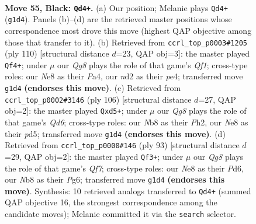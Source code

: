 \documentclass[11pt]{article}
\begin{document}
\clearpage

\begin{figure}[p]\centering
\begin{subfigure}{0.46\textwidth}\centering
\resizebox{\linewidth}{!}{%
\newchessgame
\chessboard[
  setfen={1n2n3/5k2/7p/Q7/P6K/8/3N4/6q1 b - - 10 55},
  showmover=false,
  pgfstyle=straightmove, color=movearrow, markmove={g1-d4}
]}
\caption{}
\end{subfigure}\hfill
\begin{subfigure}{0.46\textwidth}\centering
\resizebox{\linewidth}{!}{%
\newchessgame
\chessboard[
  setfen={1k6/1P6/2p5/2q5/P3p3/1K6/8/5Q2 w - - 0 56},
  showmover=false,
  pgfstyle=straightmove, color=movearrow, markmove={f1-f4}
]}
\caption{}
\end{subfigure}
\\[4pt]
\begin{subfigure}{0.46\textwidth}\centering
\resizebox{\linewidth}{!}{%
\newchessgame
\chessboard[
  setfen={8/5k2/3Q4/p2p2K1/q7/2P5/7P/8 w - - 4 54},
  showmover=false,
  pgfstyle=straightmove, color=movearrow, markmove={d6-d5}
]}
\caption{}
\end{subfigure}\hfill
\begin{subfigure}{0.46\textwidth}\centering
\resizebox{\linewidth}{!}{%
\newchessgame
\chessboard[
  setfen={8/4k3/Q2p2p1/P2P4/8/7K/5q2/8 b - - 4 47},
  showmover=false,
  pgfstyle=straightmove, color=movearrow, markmove={f2-f3}
]}
\caption{}
\end{subfigure}
\caption{\textbf{Move 55, Black: \texttt{Qd4+}.} (a) Our position; Melanie plays \texttt{Qd4+} (\texttt{g1d4}). Panels (b)--(d) are the retrieved master positions whose correspondence most drove this move (highest QAP objective among those that transfer to it). (b) Retrieved from \texttt{ccrl\_top\_p0003\#1205} (ply 110) [structural distance $d$=23, QAP obj=3]: the master played \texttt{Qf4+}; under $\mu$ our \emph{Qg8} plays the role of that game's \emph{Qf1}; cross-type roles: our \emph{N}e8 as their \emph{P}a4, our \emph{n}d2 as their \emph{p}e4; transferred move \texttt{g1d4} \textbf{(endorses this move)}. (c) Retrieved from \texttt{ccrl\_top\_p0002\#3146} (ply 106) [structural distance $d$=27, QAP obj=2]: the master played \texttt{Qxd5+}; under $\mu$ our \emph{Qg8} plays the role of that game's \emph{Qd6}; cross-type roles: our \emph{N}b8 as their \emph{P}h2, our \emph{N}e8 as their \emph{p}d5; transferred move \texttt{g1d4} \textbf{(endorses this move)}. (d) Retrieved from \texttt{ccrl\_top\_p0000\#146} (ply 93) [structural distance $d$=29, QAP obj=2]: the master played \texttt{Qf3+}; under $\mu$ our \emph{Qg8} plays the role of that game's \emph{Qf7}; cross-type roles: our \emph{N}e8 as their \emph{P}d6, our \emph{N}b8 as their \emph{P}g6; transferred move \texttt{g1d4} \textbf{(endorses this move)}. Synthesis: 10 retrieved analogs transferred to \texttt{Qd4+} (summed QAP objective 16, the strongest correspondence among the candidate moves); Melanie committed it via the \texttt{search} selector.}
\label{fig:thought-m109}
\end{figure}
\end{document}
